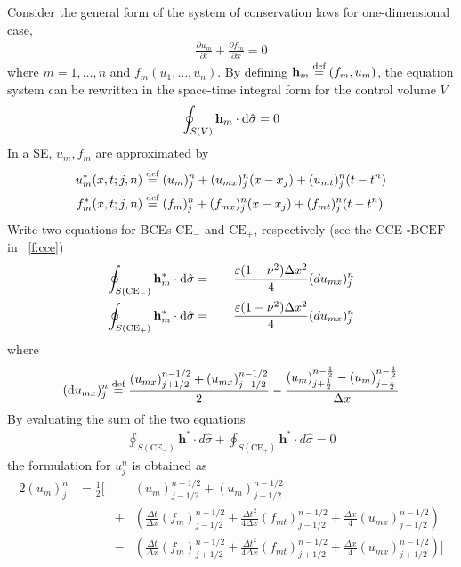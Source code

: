 \documentclass{turgon}
\begin{document}
Consider the general form of the system of conservation laws for
one-dimensional case,
\begin{align}
  \frac{\partial u_m}{\partial t} + \frac{\partial f_m}{\partial x} = 0
  \label{e:syswave}
\end{align}
where $m=1,\ldots,n$ and $f_m(u_1,\ldots,u_n)$.  By defining $\mathbf{h}_m
\defeq (f_m,u_m)$, the equation system can be rewritten in the space-time
integral form for the control volume $V$
\begin{align*}
  \oint_{S(V)}\mathbf{h}_m\cdot \mathop{}\!\mathrm{d}\hat{\sigma} = 0
\end{align*}
In a SE, $u_m, f_m$ are approximated by
\begin{align*}
  u_m^*(x,t;j,n) &\defeq (u_m)_j^n + (u_{mx})_j^n(x-x_j)
                       + (u_{mt})_j^n(t-t^n) \\
  f_m^*(x,t;j,n) &\defeq (f_m)_j^n + (f_{mx})_j^n(x-x_j)
                       + (f_{mt})_j^n(t-t^n)
\end{align*}
Write two equations for BCEs $\mathrm{CE}_-$ and $\mathrm{CE}_+$, respectively
(see the CCE $\square\mathrm{BCEF}$ in \figurename~\ref{f:cce})
\begin{alignat*}{2}
  \oint_{S(\mathrm{CE}_-)} \mathbf{h}_m^*\cdot \mathop{}\!\mathrm{d}\hat{\sigma} &=
    -&&\frac{\varepsilon(1-\nu^2)\Delta x^2}{4}(du_{mx})_j^n \\
  \oint_{S(\mathrm{CE}_+)} \mathbf{h}_m^*\cdot \mathop{}\!\mathrm{d}\hat{\sigma} &=
     &&\frac{\varepsilon(1-\nu^2)\Delta x^2}{4}(du_{mx})_j^n
\end{alignat*}
where
\begin{align}
  (\dif u_{mx})_j^n \defeq
    \frac{(u_{mx})_{j+1/2}^{n-1/2}
                + (u_{mx})_{j-1/2}^{n-1/2}}{2}
  - \frac{(u_m)_{j+\frac{1}{2}}^{n-\frac{1}{2}}
        - (u_m)_{j-\frac{1}{2}}^{n-\frac{1}{2}}}
         {\Delta x}
  \label{e:dumx}
\end{align}
By evaluating the sum of the two equations
\begin{align*}
    \oint_{S(\mathrm{CE}_-)} \mathbf{h}^*\cdot d\hat{\sigma}
  + \oint_{S(\mathrm{CE}_+)} \mathbf{h}^*\cdot d\hat{\sigma} = 0
\end{align*}
the formulation for $u_j^n$ is obtained as
\begin{alignat*}{2}
  (u_m)_j^n &= \frac{1}{2}\Big[
      &&(u_m)_{j-1/2}^{n-1/2}+(u_m)_{j+1/2}^{n-1/2} \\
  & &+ &\left(
        \frac{\Delta t}{\Delta x}(f_m)_{j-1/2}^{n-1/2}
      + \frac{\Delta t^2}{4\Delta x}(f_{mt})_{j-1/2}^{n-1/2}
      + \frac{\Delta x}{4}(u_{mx})_{j-1/2}^{n-1/2}
      \right) \\
  & &- &\left(
        \frac{\Delta t}{\Delta x}(f_m)_{j+1/2}^{n-1/2}
      + \frac{\Delta t^2}{4\Delta x}(f_{mt})_{j+1/2}^{n-1/2}
      + \frac{\Delta x}{4}(u_{mx})_{j+1/2}^{n-1/2}
      \right)
    \Big]
\end{alignat*}
\end{document}
